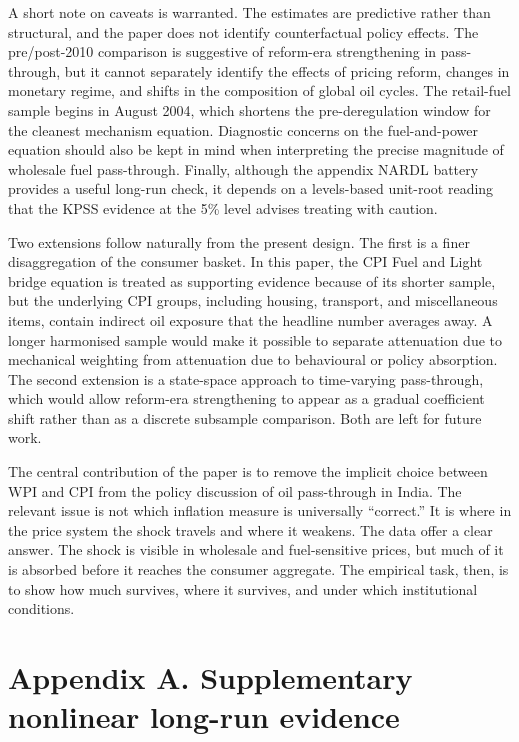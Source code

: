 \documentclass[11pt,a4paper]{article}
\begin{document}
A short note on caveats is warranted. The estimates are predictive rather than structural, and the paper does not identify counterfactual policy effects. The pre/post-2010 comparison is suggestive of reform-era strengthening in pass-through, but it cannot separately identify the effects of pricing reform, changes in monetary regime, and shifts in the composition of global oil cycles. The retail-fuel sample begins in August 2004, which shortens the pre-deregulation window for the cleanest mechanism equation. Diagnostic concerns on the fuel-and-power equation should also be kept in mind when interpreting the precise magnitude of wholesale fuel pass-through. Finally, although the appendix NARDL battery provides a useful long-run check, it depends on a levels-based unit-root reading that the KPSS evidence at the 5\% level advises treating with caution.

Two extensions follow naturally from the present design. The first is a finer disaggregation of the consumer basket. In this paper, the CPI Fuel and Light bridge equation is treated as supporting evidence because of its shorter sample, but the underlying CPI groups, including housing, transport, and miscellaneous items, contain indirect oil exposure that the headline number averages away. A longer harmonised sample would make it possible to separate attenuation due to mechanical weighting from attenuation due to behavioural or policy absorption. The second extension is a state-space approach to time-varying pass-through, which would allow reform-era strengthening to appear as a gradual coefficient shift rather than as a discrete subsample comparison. Both are left for future work.

The central contribution of the paper is to remove the implicit choice between WPI and CPI from the policy discussion of oil pass-through in India. The relevant issue is not which inflation measure is universally ``correct.'' It is where in the price system the shock travels and where it weakens. The data offer a clear answer. The shock is visible in wholesale and fuel-sensitive prices, but much of it is absorbed before it reaches the consumer aggregate. The empirical task, then, is to show how much survives, where it survives, and under which institutional conditions.



\appendix

\section*{Appendix A. Supplementary nonlinear long-run evidence}
\end{document}
